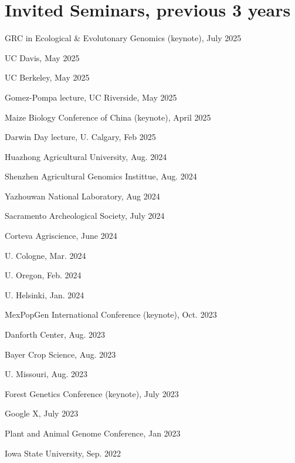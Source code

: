 \documentclass[letterpaper,10pt]{article}
\renewenvironment{itemize}{
  \begin{list}{}{
    \setlength{\leftmargin}{1.5em}
  }
}{
  \end{list}
}
\begin{document}
\section*{Invited Seminars, previous 3 years}
\begin{itemize}
\setlength\itemsep{0ex}
\item GRC in Ecological \& Evolutonary Genomics (keynote), July 2025
\item UC Davis, May 2025
\item UC Berkeley, May 2025
\item Gomez-Pompa lecture, UC Riverside, May 2025
\item Maize Biology Conference of China (keynote), April 2025
\item Darwin Day lecture, U. Calgary, Feb 2025
\item Huazhong Agricultural University, Aug. 2024
\item Shenzhen Agricultural Genomics Instittue, Aug. 2024
\item Yazhouwan National Laboratory, Aug 2024
\item Sacramento Archeological Society, July 2024
\item Corteva Agriscience, June 2024
\item U. Cologne, Mar. 2024
\item U. Oregon, Feb. 2024
\item U. Helsinki, Jan. 2024
\item MexPopGen International Conference (keynote), Oct. 2023
\item Danforth Center, Aug. 2023
\item Bayer Crop Science, Aug. 2023
\item U. Missouri, Aug. 2023
\item Forest Genetics Conference (keynote), July 2023
\item Google X, July 2023
\item Plant and Animal Genome Conference, Jan 2023
\item Iowa State University, Sep. 2022

\end{itemize}
\end{document}
